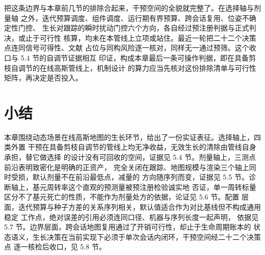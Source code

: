 把这条边界与本章前几节的排除合起来，干预空间的全貌就完整了。在选择轴与剂量轴
之外，迭代预算调度、组件调度、运行期有界预算、跨会话复用、位姿不确定性门控、
生长对跟踪的瞬时扰动门控六个方向，各自经过预注册判据与正式判决，或止于可行性
核算，均未在本管线上立项或站住。最近一轮把二十二个决策点连同信号可得性、文献
占位与同构风险逐一核对，同样无一通过预筛。这个收口与 5.4 节的自调节证据相互
印证，构成本章最后一条可操作判据，即在具备剪枝自调节的在线高斯管线上，机制设计
的算力应当先核对这份排除清单与可行性矩阵，再决定是否投入。

\section{小结}
\label{sec:study3-summary}

本章围绕动态场景在线高斯地图的生长环节，给出了一份实证表征。选择轴上，四类外置
干预在具备剪枝自调节的管线上均无净收益，无效生长的清除由管线自身承担，替它做选择
的设计没有可回收的空间，证据见 5.4 节。剂量轴上，三测点前沿表明致密化是明确的正资产，
完全关闭在跟踪、地图规模与渲染三个轴上同时受损，默认剂量不在前沿最低点，减量的
方向随序列而变，证据见 5.5 节。诊断轴上，基元周转率这个直观的预测量被预注册检验诚实地
否证，单一周转标量区分不了基元死亡的性质，不能作为剂量处方的依据，论证见 5.6 节。配置
层面，迭代预算与种子方差的关系序列相关，默认值适合作为对比基线但不构成通用稳定
工作点，绝对误差的引用必须连同口径、机器与序列长度一起声明，
依据见 5.7 节。边界层面，跨会话地图复用通过了开销可行性，却止于生命周期账本的
状态语义，生长决策在当前实现下必须于单次会话内闭环，干预空间经二十二个决策点
逐一核检后收口，见 5.8 节。


